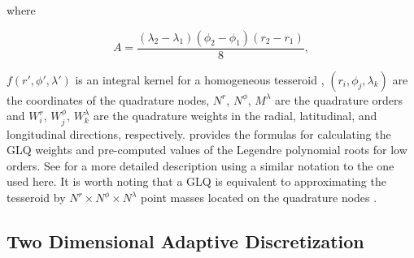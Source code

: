 \documentclass[extra, referee]{gji}
\begin{document}

\noindent where

\begin{equation}
    A = \frac{(\lambda_2 - \lambda_1)(\phi_2 - \phi_1)(r_2 - r_1)}{8},
\end{equation}

\noindent $f(r', \phi', \lambda')$ is an integral kernel for a homogeneous tesseroid
\citep{Grombein2013},
$(r_i, \phi_j, \lambda_k)$ are the coordinates of the quadrature nodes,
$N^r$, $N^\phi$, $M^\lambda$ are the quadrature orders and $W_i^r$, $W_j^\phi$,
$W_k^\lambda$ are the quadrature weights in the radial, latitudinal, and longitudinal
directions, respectively.
\citet[p.~391]{Hildebrand1987} provides the formulas for calculating the GLQ weights and
pre-computed values of the Legendre polynomial roots for low orders.
See \citet{Uieda2016} for a more detailed description using a similar notation to the
one used here.
It is worth noting that a GLQ is equivalent to approximating the tesseroid by $N^r
\times N^\phi \times N^\lambda$ point masses located on the quadrature nodes
\citep{Ku1977, Asgharzadeh2007}.


\subsection{Two Dimensional Adaptive Discretization}
\end{document}
